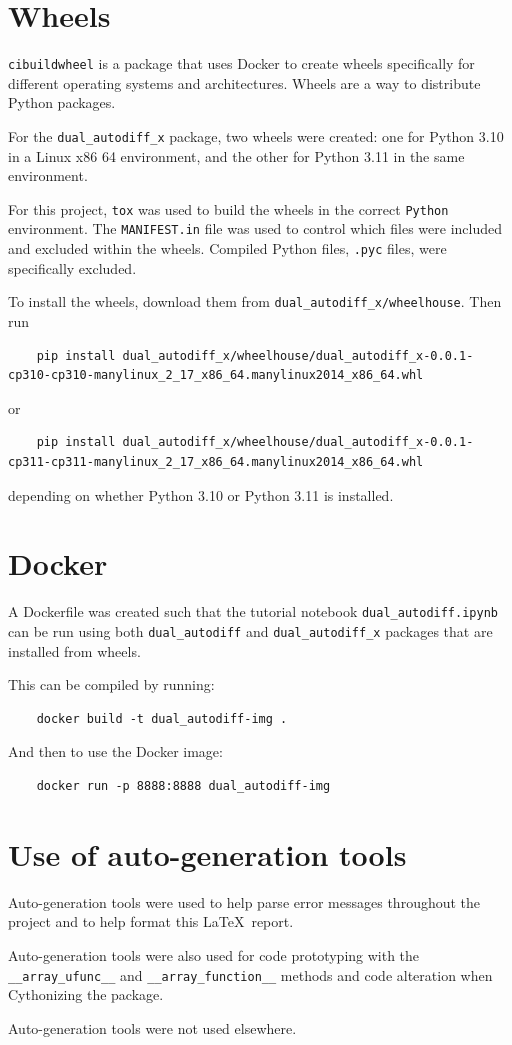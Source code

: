 \documentclass[11pt,a4paper]{article}
\begin{document}
\section{Wheels}

\texttt{cibuildwheel} is a package that uses Docker to create wheels specifically for different operating systems and architectures. Wheels are a way to distribute Python packages.

For the \texttt{dual\_autodiff\_x} package, two wheels were created: one for Python 3.10 in a Linux x86 64 environment, and the other for Python 3.11 in the same environment.

For this project, \texttt{tox} was used to build the wheels in the correct \texttt{Python} environment. The \texttt{MANIFEST.in} file was used to control which files were included and excluded within the wheels. Compiled Python files, \texttt{.pyc} files, were specifically excluded.

To install the wheels, download them from \texttt{dual\_autodiff\_x/wheelhouse}. Then run
\begin{lstlisting}
    pip install dual_autodiff_x/wheelhouse/dual_autodiff_x-0.0.1-cp310-cp310-manylinux_2_17_x86_64.manylinux2014_x86_64.whl
\end{lstlisting}
or
\begin{lstlisting}
    pip install dual_autodiff_x/wheelhouse/dual_autodiff_x-0.0.1-cp311-cp311-manylinux_2_17_x86_64.manylinux2014_x86_64.whl    
\end{lstlisting}
depending on whether Python 3.10 or Python 3.11 is installed.
\clearpage
\section{Docker}
A Dockerfile was created such that the tutorial notebook \texttt{dual\_autodiff.ipynb} can be run using both \texttt{dual\_autodiff} and \texttt{dual\_autodiff\_x} packages that are installed from wheels.

This can be compiled by running:
\begin{lstlisting}
    docker build -t dual_autodiff-img .
\end{lstlisting}
And then to use the Docker image:
\begin{lstlisting}
    docker run -p 8888:8888 dual_autodiff-img
\end{lstlisting}


\appendix
\section{Use of auto-generation tools}
Auto-generation tools were used to help parse error messages throughout the project and to help format this \LaTeX\ report.

Auto-generation tools were also used for code prototyping with the \texttt{\_\_array\_ufunc\_\_} and \texttt{\_\_array\_function\_\_} methods and code alteration when Cythonizing the package.

Auto-generation tools were not used elsewhere.
\end{document}
